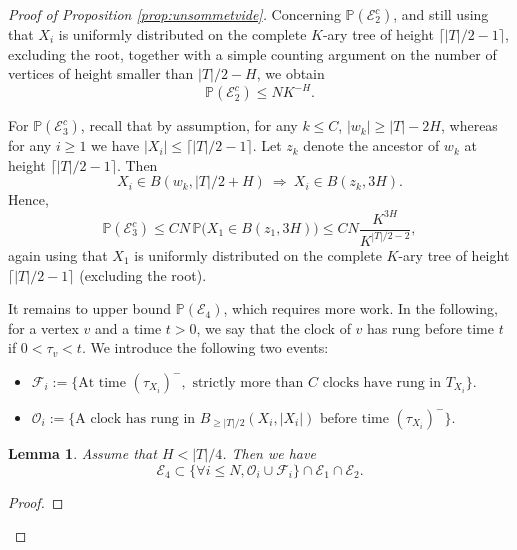 \documentclass[french]{article}
\newtheorem{lemma}[theorem]{Lemma}
\renewcommand{\P}{\mathbb{P}}
\newcommand{\Tf}{T}
\renewcommand{\1}{\mathds{1}}
\begin{document}
\begin{proof}[Proof of Proposition \ref{prop:unsommetvide}]
Concerning $\P(\mathcal{E}_2^c)$, and still using that $X_i$ is uniformly distributed on the complete $K$-ary tree of height $\lceil |\Tf|/2-1 \rceil$, excluding the root, together with a simple counting argument on the number of vertices of height smaller than $|\Tf|/2-H$, we obtain
\begin{equation}\label{eq:E2}
\P(\mathcal{E}_2^c)\le N K^{-H}.
\end{equation}

For $\P(\mathcal{E}_3^c)$, recall that by assumption, for any $k\le C$, $|w_k|\ge |\Tf|-2H$, whereas for any $i\ge 1$ we have $|X_i|\le \lceil |\Tf|/2-1 \rceil$. Let $z_k$ denote the ancestor of $w_k$ at height $\lceil |\Tf|/2-1 \rceil$. Then
$$
X_i\in B(w_k,|\Tf|/2+H)\ \Longrightarrow\ X_i\in B(z_k,3H).
$$
Hence,
\begin{equation}\label{eq:E3}
\P(\mathcal{E}_3^c)
\le CN\,\P\bigl(X_1\in B(z_1,3H)\bigr)
\le CN \frac{K^{3H}}{K^{|\Tf|/2-2}},
\end{equation}
again using that $X_1$ is uniformly distributed on the complete $K$-ary tree of height $\lceil |\Tf|/2-1 \rceil$ (excluding the root).
\medskip


It remains to upper bound $\P(\mathcal{E}_4)$, which requires more work. In the following, for a vertex $v$ and a time $t>0$, we say that the clock of $v$ has rung before time $t$ if $0<\tau_v<t$. We introduce the following two events:
\begin{itemize}
\item[(i)] $\mathcal{F}_i := \{\text{At time } (\tau_{X_i})^{-}, \text{ strictly more than } C \text{ clocks have rung in } \Tf_{X_i}\}$.
\item[(ii)] $\mathcal{O}_i := \{\text{A clock has rung in } B_{\ge |\Tf|/2}(X_i, |X_i|) \text{ before time } (\tau_{X_i})^{-}\}$.
\end{itemize}



\begin{lemma} Assume that $H< |\Tf|/4$. Then
   we have $$\mathcal{E}_4\subset \{\forall i\le N, \mathcal{O}_i \cup \mathcal{F}_i\}\cap \mathcal{E}_1\cap \mathcal{E}_2.$$
\end{lemma}


\begin{proof}


\end{proof}
\end{proof}
\end{document}

